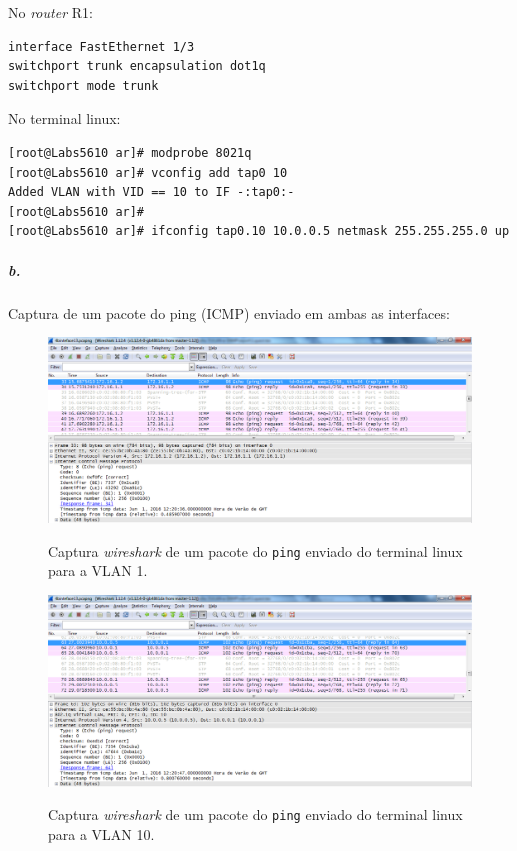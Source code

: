 No \emph{router} \textsf{R1}:
\begin{verbatim}
interface FastEthernet 1/3
switchport trunk encapsulation dot1q
switchport mode trunk
\end{verbatim}

No terminal \textsf{linux}:
\begin{verbatim}
[root@Labs5610 ar]# modprobe 8021q
[root@Labs5610 ar]# vconfig add tap0 10
Added VLAN with VID == 10 to IF -:tap0:-
[root@Labs5610 ar]# 
[root@Labs5610 ar]# ifconfig tap0.10 10.0.0.5 netmask 255.255.255.0 up
\end{verbatim}


\subparagraph{b.}
Captura de um pacote do \textsf{ping} (ICMP) enviado em ambas as interfaces:

\begin{figure}[h]
\centering
\includegraphics[width=1\textwidth, height=0.33\textheight]{ping_VLAN1.png}
\label{fig:5-capturaWireshark}
\caption{Captura \emph{wireshark} de um pacote do \texttt{ping} enviado do terminal \textsf{linux} para a \textsf{VLAN 1}.}
\end{figure}

\begin{figure}[h]
\centering
\includegraphics[width=1\textwidth, height=0.33\textheight]{ping_VLAN10.png}
\label{fig:6-capturaWireshark}
\caption{Captura \emph{wireshark} de um pacote do \texttt{ping} enviado do terminal \textsf{linux} para a \textsf{VLAN 10}.}
\end{figure}


